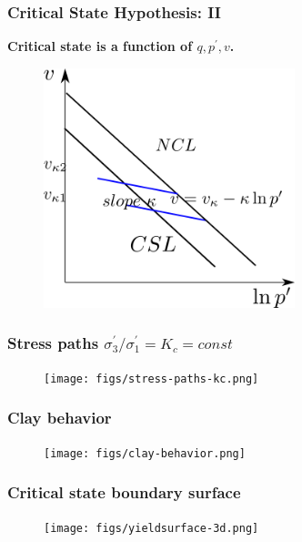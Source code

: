 \documentclass[notes]{beamer}
\begin{document}


\begin{frame}
\frametitle{Critical State Hypothesis: II}
\textbf{Critical state is a function of $q, p^\prime, v$. }
\begin{figure}
	\includegraphics[width=0.65\textwidth]{figs/kappa.png}
\end{figure}
\end{frame}



\begin{frame}
\frametitle{Stress paths $\sigma_3^\prime / \sigma_1^\prime = K_c = const$}
\begin{figure}
	\texttt{[image: figs/stress-paths-kc.png]}
\end{figure}
\end{frame}

\begin{frame}
\frametitle{Clay behavior}
\begin{figure}
	\texttt{[image: figs/clay-behavior.png]}
\end{figure}
\end{frame}

\begin{frame}
\frametitle{Critical state boundary surface}
\begin{figure}
	\texttt{[image: figs/yieldsurface-3d.png]}
\end{figure}
\end{frame}
\end{document}

